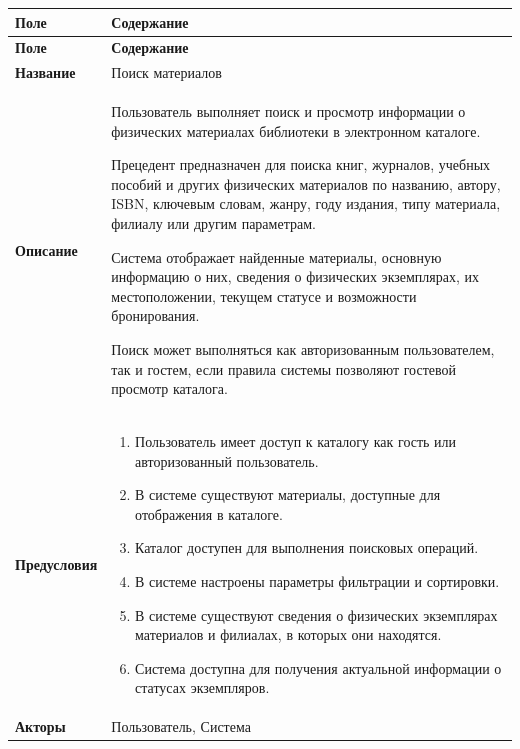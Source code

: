 \documentclass[12pt,a4paper]{article}
\begin{document}
	\begin{xltabular}{\textwidth}{
			|>{\raggedright\arraybackslash}p{2.7cm}
			|>{\raggedright\arraybackslash}X|
		}
		\hline
		\textbf{Поле} & \textbf{Содержание} \\
		\hline
		\endfirsthead
		
		\hline
		\textbf{Поле} & \textbf{Содержание} \\
		\hline
		\endhead
		
		\hline
		\endfoot
		
		\textbf{Название} &
		Поиск материалов \\
		\hline
		
		\textbf{Описание} &
		Пользователь выполняет поиск и просмотр информации о физических
		материалах библиотеки в электронном каталоге.
		
		Прецедент предназначен для поиска книг, журналов, учебных пособий
		и других физических материалов по названию, автору, ISBN,
		ключевым словам, жанру, году издания, типу материала, филиалу или
		другим параметрам.
		
		Система отображает найденные материалы, основную информацию о
		них, сведения о физических экземплярах, их местоположении,
		текущем статусе и возможности бронирования.
		
		Поиск может выполняться как авторизованным пользователем, так и
		гостем, если правила системы позволяют гостевой просмотр каталога. \\
		\hline
		
		\textbf{Предусловия} &
		\begin{enumerate}
			\item Пользователь имеет доступ к каталогу как гость или
			авторизованный пользователь.
			\item В системе существуют материалы, доступные для отображения
			в каталоге.
			\item Каталог доступен для выполнения поисковых операций.
			\item В системе настроены параметры фильтрации и сортировки.
			\item В системе существуют сведения о физических экземплярах
			материалов и филиалах, в которых они находятся.
			\item Система доступна для получения актуальной информации о
			статусах экземпляров.
		\end{enumerate} \\
		\hline
		
		\textbf{Акторы} &
		Пользователь, Система \\
		\hline
		

\end{xltabular}
\end{document}
